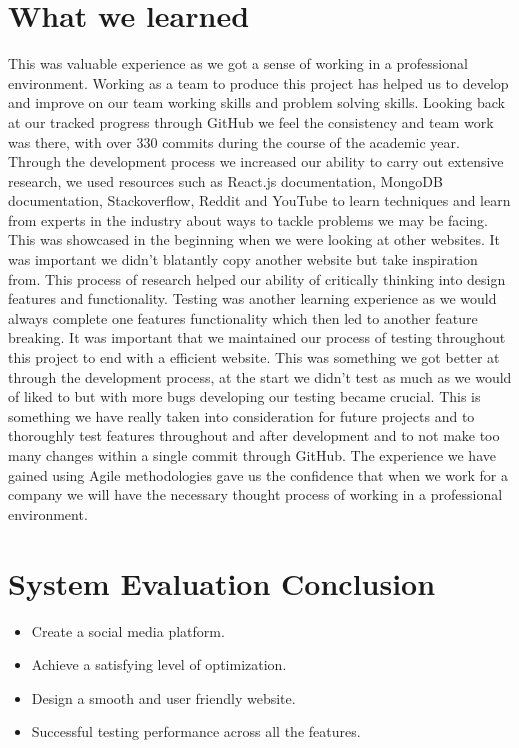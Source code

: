 \section{What we learned}
This was valuable experience as we got a sense of working in a professional environment. Working as a team to produce this project has helped us to develop and improve on our team working skills and problem solving skills. Looking back at our tracked progress through GitHub we feel the consistency and team work was there, with over 330 commits during the course of the academic year. Through the development process we increased our ability to carry out extensive research, we used resources such as React.js documentation, MongoDB documentation, Stackoverflow, Reddit and YouTube to learn techniques and learn from experts in the industry about ways to tackle problems we may be facing. This was showcased in the beginning when we were looking at other websites. It was important we didn't blatantly copy another website but take inspiration from. This process of research helped our ability of critically thinking into design features and functionality. 
Testing was another learning experience as we would always complete one features functionality which then led to another feature breaking. It was important that we maintained our process of testing throughout this project to end with a efficient website. This was something we got better at through the development process, at the start we didn't test as much as we would of liked to but with more bugs developing our testing became crucial. This is something we have really taken into consideration for future projects and to thoroughly test features throughout and after development and to not make too many changes within a single commit through GitHub.
The experience we have gained using Agile methodologies gave us the confidence that when we work for a company we will have the necessary thought process of working in a professional environment. 

\section{System Evaluation Conclusion}
\begin{itemize}
    \item Create a social media platform.
    \item Achieve a satisfying level of optimization.
    \item Design a smooth and user friendly website.
    \item Successful testing performance across all the features.
\end{itemize}

